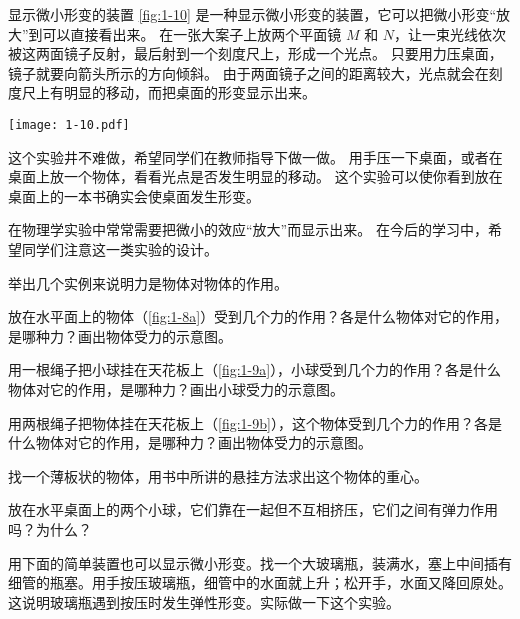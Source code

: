 \begin{Reading}{显示微小形变的装置}
\cref{fig:1-10} 是一种显示微小形变的装置，它可以把微小形变“放大”到可以直接看出来。
在一张大案子上放两个平面镜 $M$ 和 $N$，让一束光线依次被这两面镜子反射，最后射到一个刻度尺上，形成一个光点。
只要用力压桌面，镜子就要向箭头所示的方向倾斜。
由于两面镜子之间的距离较大，光点就会在刻度尺上有明显的移动，而把桌面的形变显示出来。

\begin{figurehere}
  \begin{minipage}{\linewidth}\centering
    \texttt{[image: 1-10.pdf]}
    \caption{显示微小形变的装置}\label{fig:1-10}
  \end{minipage}
\end{figurehere}

这个实验井不难做，希望同学们在教师指导下做一做。
用手压一下桌面，或者在桌面上放一个物体，看看光点是否发生明显的移动。
这个实验可以使你看到放在桌面上的一本书确实会使桌面发生形变。

在物理学实验中常常需要把微小的效应“放大”而显示出来。
在今后的学习中，希望同学们注意这一类实验的设计。
\end{Reading}

\begin{Practice}
\begin{question}
  \item 举出几个实例来说明力是物体对物体的作用。
  \item 放在水平面上的物体（\cref{fig:1-8a}）受到几个力的作用？各是什么物体对它的作用，是哪种力？画出物体受力的示意图。
  \item 用一根绳子把小球挂在天花板上（\cref{fig:1-9a}），小球受到几个力的作用？各是什么物体对它的作用，是哪种力？画出小球受力的示意图。
  \item 用两根绳子把物体挂在天花板上（\cref{fig:1-9b}），这个物体受到几个力的作用？各是什么物体对它的作用，是哪种力？画出物体受力的示意图。
  \item 找一个薄板状的物体，用书中所讲的悬挂方法求出这个物体的重心。
  \item 放在水平桌面上的两个小球，它们靠在一起但不互相挤压，它们之间有弹力作用吗？为什么？
  \item 用下面的简单装置也可以显示微小形变。找一个大玻璃瓶，装满水，塞上中间插有细管的瓶塞。用手按压玻璃瓶，细管中的水面就上升；松开手，水面又降回原处。这说明玻璃瓶遇到按压时发生弹性形变。实际做一下这个实验。
\end{question}
\end{Practice}

